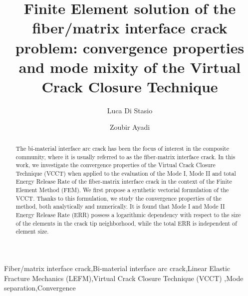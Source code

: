 \documentclass[review]{elsarticle}
\begin{document}
\begin{frontmatter}

\title{Finite Element solution of the fiber/matrix interface crack problem: convergence properties and mode mixity of the Virtual Crack Closure Technique}


\author[lulea,nancy]{Luca Di Stasio}
\author[nancy]{Zoubir Ayadi}


\address[lulea]{Lule\aa\ University of Technology, University Campus, SE-97187 Lule\aa, Sweden}
\address[nancy]{Universit\'e de Lorraine, EEIGM, IJL, 6 Rue Bastien Lepage, F-54010 Nancy, France}

\begin{abstract}
\noindent
The bi-material interface arc crack has been the focus of interest in the composite community, where it is usually referred to as the fiber-matrix interface crack. In this work, we investigate the convergence properties of the Virtual Crack Closure Technique (VCCT) when applied to the evaluation of the Mode I, Mode II and total Energy Release Rate of the fiber-matrix interface crack in the context of the Finite Element Method (FEM). We first propose a synthetic vectorial formulation of the VCCT. Thanks to this formulation, we study the convergence properties of the method, both analytically and numerically. It is found that Mode I and Mode II Energy Release Rate (ERR) possess a logarithmic dependency with respect to the size of the elements in the crack tip neighborhood, while the total ERR is independent of element size.
\end{abstract}

\begin{keyword}
Fiber/matrix interface crack\sep Bi-material interface arc crack\sep Linear Elastic Fracture Mechanics (LEFM)\sep Virtual Crack Closure Technique (VCCT) \sep Mode separation\sep Convergence
\end{keyword}

\end{frontmatter}
\end{document}
